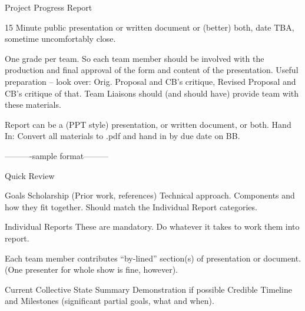 

Project Progress Report

15 Minute public presentation or written document or (better) both,
date TBA, sometime uncomfortably close.

One grade per team.  So each team member should be involved
with the production and final approval of the form and content of the
presentation.  Useful preparation --  look over:  Orig. Proposal and 
CB's critique, Revised Proposal and CB's critique of that.  Team
Liaisons should (and should have) provide team with these materials.

Report can be a (PPT style) presentation, or written document, or both.
   Hand In: Convert all materials to .pdf and hand in by due date on BB.



----------sample format---------



Quick Review

   Goals
   Scholarship (Prior work, references)
   Technical approach.  Components and how they fit together.  Should
   match the Individual Report categories.


Individual Reports
 These are mandatory. Do whatever it takes to work them into report.

  Each team member contributes  ``by-lined'' section(s) of presentation
  or document.  (One presenter for whole show is fine, however).


Current Collective State
   Summary
   Demonstration if possible
   Credible Timeline and Milestones (significant partial goals, what
   and when).








